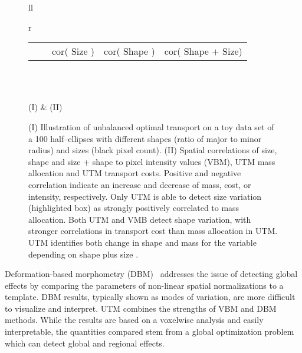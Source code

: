 \documentclass{llncs}
\begin{document}
\begin{figure}[t!]
\begin{tabular}{ll}
\begin{tabular}{r}
\begin{tabular}{rl|ccc}
  \raisebox{-2mm}{\texttt{[image: cor-rx-ry-mass]} }&
  \raisebox{-2mm}{\texttt{[image: cor-rx-ry-mass-mass]} }\\ \hline 
  &
  & cor( Size ) 
  & cor( Shape )
  & cor( Shape + Size)
\end{tabular}\\
\end{tabular}\\
  (I) & (II) \\
\end{tabular}
\caption{\label{fig:cor-ellipse}
(I) Illustration of unbalanced optimal transport on a toy data set of a 100
half--ellipses with different shapes (ratio of major to minor radius) and sizes
(black pixel count).  (II) Spatial correlations of size, shape and
size + shape to pixel intensity values (VBM), UTM mass allocation
and UTM transport costs.  Positive and negative correlation indicate an
increase and decrease of mass, cost, or intensity, respectively. Only UTM is
able to detect size variation (highlighted box) as strongly positively
correlated to mass allocation.  Both UTM and VMB detect shape variation,
with stronger correlations in transport cost than mass allocation in UTM. UTM
identifies both change in shape and mass for the variable depending on shape
plus size . 
\vspace{-7mm}
}
\end{figure}

Deformation-based morphometry (DBM)~\cite{ashburner1998identifying} addresses
the issue of detecting global effects by comparing the parameters of non-linear
spatial normalizations to a template.  DBM results, typically shown as modes of
variation, are more difficult to visualize and interpret.  UTM combines the
strengths of VBM and DBM methods.  While the results are based on a voxelwise
analysis and easily interpretable, the quantities compared stem from a global
optimization problem which can detect global and regional effects.  
\end{document}

